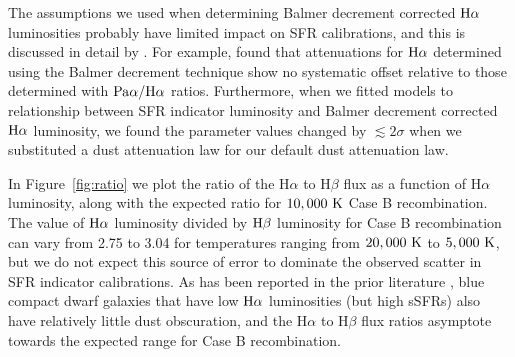 \documentclass[preprint]{aastex61}
\begin{document}
The assumptions we used when determining Balmer decrement corrected ${\rm H\alpha}$ luminosities probably have limited impact on SFR calibrations, and this is discussed in detail by \citet{ken09}.  For example, \citet{cal07} found that attenuations for ${\rm H\alpha}$ determined using the Balmer decrement technique show no systematic offset relative to those determined with ${\rm Pa \alpha / H \alpha}$ ratios. Furthermore, when we fitted models to relationship between SFR indicator luminosity and Balmer decrement corrected ${\rm H\alpha}$ luminosity, we found the parameter values changed by $\lesssim 2\sigma$ when we substituted a \citet{cal00} dust attenuation law for our default \citet{fit99} dust attenuation law.

In Figure~\ref{fig:ratio} we plot the ratio of the H$\alpha$ to H$\beta$ flux as a function of H$\alpha$ luminosity, along with the expected ratio for $10,000~{\rm K}$ Case B recombination. The value of ${\rm H\alpha}$ luminosity divided by ${\rm H\beta}$ luminosity for Case B recombination can vary from 2.75 to 3.04 for temperatures ranging from $20,000~{\rm K}$ to $5,000~{\rm K}$, but we do not expect this source of error to dominate the observed scatter in SFR indicator calibrations. As has been reported in the prior literature \citep[e.g.,][]{lee09}, blue compact dwarf galaxies that have low ${\rm H\alpha}$ luminosities (but high sSFRs) also have relatively little dust obscuration, and the H$\alpha$ to H$\beta$ flux ratios asymptote towards the expected range for Case B recombination. 

\begin{figure*}
\caption{The ratio of observed H$\alpha$ luminosity to observed H$\beta$ luminosity, as a function of H$\alpha$ luminosity (left panel) and H$\beta$ signal-to-noise (right panel). Galaxies used for the star formation rate calibration are shown with blue stars, BPT selected AGNs are shown with red dots and other galaxies (including those with low signal-to-noise emission line fluxes) are shown in grey. Dust obscuration increases with increasing luminosity, while at low luminosities the ratio of $\alpha$ luminosity to H$\beta$ luminosity approaches the value expected for Case~B recombination. The spread of H$\alpha$ luminosity to H$\beta$ luminosity ratios does depend on signal-to-noise, with spuriously low values being associated with mediocre signal-to-noise.}
\label{fig:ratio}
\end{figure*}
\end{document}
